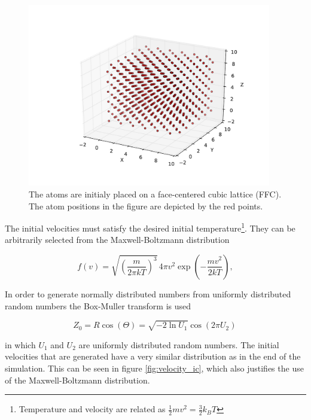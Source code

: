 \documentclass{article}
\begin{document}
\begin{figure}[!htb]
  \centering
    \includegraphics[height=80mm]{fcc.pdf}
  \caption[]{The atoms are initialy placed on a face-centered cubic lattice (FFC). The atom positions in the figure are depicted by the red points.}
  \label{fig:lattice}
\end{figure}

The initial velocities must satisfy the desired initial temperature\footnote{Temperature and velocity are related as $\frac{1}{2}mv^2=\frac{3}{2}k_B T$}. They can be arbitrarily selected from the Maxwell-Boltzmann distribution

\begin{equation}
  f(v) = \sqrt{\left(\frac{m}{2 \pi kT}\right)^3}\, 4\pi v^2 \exp \left(- \frac{mv^2}{2kT}\right), 
\end{equation}

In order to generate normally distributed numbers from uniformly distributed random numbers the Box-Muller transform is used

\begin{equation}
 Z_0 = R \cos(\Theta) =\sqrt{-2 \ln U_1} \cos(2 \pi U_2)\,
\end{equation}

in which $U_1$ and $U_2$ are uniformly distributed random numbers. The initial velocities that are generated have a very similar distribution as in the end of the simulation. This can be seen in figure \ref{fig:velocity_ic}, which also justifies the use of the Maxwell-Boltzmann distribution.
\end{document}

